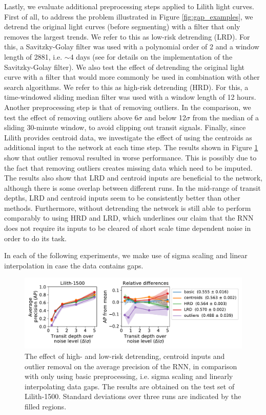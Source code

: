 Lastly, we evaluate additional preprocessing steps applied to Lilith light curves. First of all, to address the problem illustrated in Figure \ref{fig:gap_examples}, we detrend the original light curves (before segmenting) with a filter that only removes the largest trends. We refer to this as low-risk detrending (LRD). For this, a Savitzky-Golay filter was used with a polynomial order of 2 and a window length of 2881, i.e. $\sim$4 days (see \cite{hippke2019wotan} for details on the implementation of the Savitzky-Golay filter). We also test the effect of detrending the original light curve with a filter that would more commonly be used in combination with other search algorithms. We refer to this as high-risk detrending (HRD). For this, a time-windowed sliding median filter was used with a window length of 12 hours. Another preprocessing step is that of removing outliers. In the comparison, we test the effect of removing outliers above 6$\sigma$ and below 12$\sigma$ from the median of a sliding 30-minute window, to avoid clipping out transit signals. Finally, since Lilith provides centroid data, we investigate the effect of using the centroids as additional input to the network at each time step. The results shown in Figure \ref{fig:lilith_pp_advanced} show that outlier removal resulted in worse performance. This is possibly due to the fact that removing outliers creates missing data which need to be imputed. The results also show that LRD and centroid inputs are beneficial to the network, although there is some overlap between different runs. In the mid-range of transit depths, LRD and centroid inputs seem to be consistently better than other methods. Furthermore, without detrending the network is still able to perform comparably to using HRD and LRD, which underlines our claim that the RNN does not require its inputs to be cleared of short scale time dependent noise in order to do its task.

In each of the following experiments, we make use of sigma scaling and linear interpolation in case the data contains gaps.
\begin{figure}
    \centering
    \includegraphics[width=0.7\linewidth]{Experiments/Figures/Preprocessing/lilith1500_AP_pp-advanced.pdf}
    \caption{ The effect of high- and low-risk detrending, centroid inputs and outlier removal on the average precision of the RNN, in comparison with only using basic preprocessing, i.e. sigma scaling and linearly interpolating data gaps. The results are obtained on the test set of Lilith-1500. Standard deviations over three runs are indicated by the filled regions.}
    \label{fig:lilith_pp_advanced}
\end{figure}
